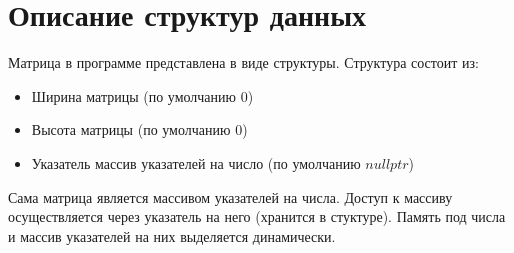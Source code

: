 \section*{Описание структур данных}

Матрица в программе представлена в виде структуры.
Структура состоит из:

\begin{itemize}
	\item Ширина матрицы (по умолчанию 0)
	\item Высота матрицы (по умолчанию 0)
	\item Указатель массив указателей на число (по умолчанию $ nullptr $)
\end{itemize}

Сама матрица является массивом указателей на числа. 
Доступ к массиву осуществляется через указатель на него (хранится в стуктуре). 
Память под числа и массив указателей на них выделяется динамически. 
